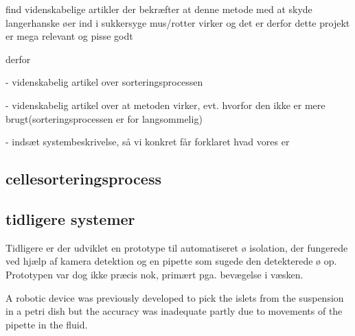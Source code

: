  
 
 find videnskabelige artikler der bekræfter at denne metode med at skyde langerhanske øer ind i sukkersyge mus/rotter virker og det er derfor dette projekt er mega relevant og pisse godt
 
 derfor
 
 - videnskabelig artikel over sorteringsprocessen
 
 - videnskabelig artikel over at metoden virker, evt. hvorfor den ikke er mere brugt(sorteringsprocessen er for langsommelig)
 
 
 
 
 
 
 - indsæt systembeskrivelse, så vi konkret får forklaret hvad vores er
 
 \subsection{cellesorteringsprocess}
 \subsection{tidligere systemer}
 Tidligere er der udviklet en prototype til automatiseret ø isolation, der fungerede ved hjælp af kamera detektion og en pipette som sugede den detekterede ø op. Prototypen var dog ikke præcis nok, primært pga. bevægelse i væsken. 
 
 A robotic device was previously developed to pick the islets from the suspension in a petri dish but the accuracy was inadequate partly due to movements of the pipette in the fluid.
